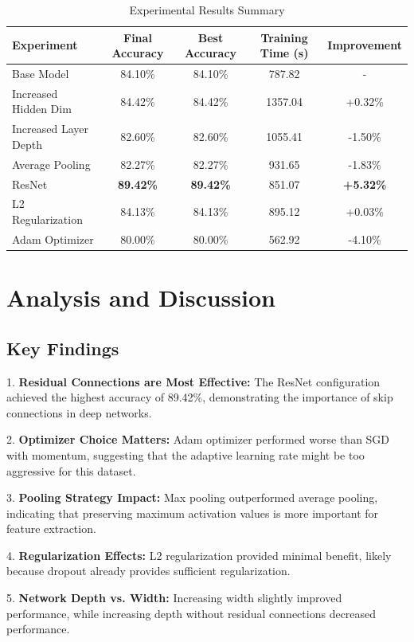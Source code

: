 \documentclass{article}
\begin{document}
\begin{table}[H]
\centering
\begin{tabular}{@{}lcccc@{}}
\toprule
\textbf{Experiment} & \textbf{Final Accuracy} & \textbf{Best Accuracy} & \textbf{Training Time (s)} & \textbf{Improvement} \\
\midrule
Base Model & 84.10\% & 84.10\% & 787.82 & - \\
Increased Hidden Dim & 84.42\% & 84.42\% & 1357.04 & +0.32\% \\
Increased Layer Depth & 82.60\% & 82.60\% & 1055.41 & -1.50\% \\
Average Pooling & 82.27\% & 82.27\% & 931.65 & -1.83\% \\
ResNet & \textbf{89.42\%} & \textbf{89.42\%} & 851.07 & \textbf{+5.32\%} \\
L2 Regularization & 84.13\% & 84.13\% & 895.12 & +0.03\% \\
Adam Optimizer & 80.00\% & 80.00\% & 562.92 & -4.10\% \\
\bottomrule
\end{tabular}
\caption{Experimental Results Summary}
\label{tab:results}
\end{table}

\section{Analysis and Discussion}

\subsection{Key Findings}

1. \textbf{Residual Connections are Most Effective:} The ResNet configuration achieved the highest accuracy of 89.42\%, demonstrating the importance of skip connections in deep networks.

2. \textbf{Optimizer Choice Matters:} Adam optimizer performed worse than SGD with momentum, suggesting that the adaptive learning rate might be too aggressive for this dataset.

3. \textbf{Pooling Strategy Impact:} Max pooling outperformed average pooling, indicating that preserving maximum activation values is more important for feature extraction.

4. \textbf{Regularization Effects:} L2 regularization provided minimal benefit, likely because dropout already provides sufficient regularization.

5. \textbf{Network Depth vs. Width:} Increasing width slightly improved performance, while increasing depth without residual connections decreased performance.
\end{document}
